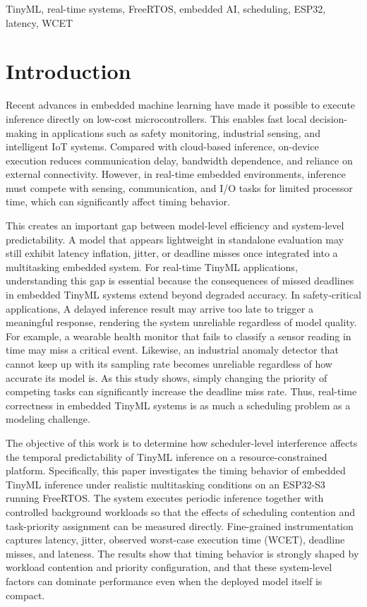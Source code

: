 \documentclass[conference]{IEEEtran}
\begin{document}
\begin{IEEEkeywords}
TinyML, real-time systems, FreeRTOS, embedded AI, scheduling, ESP32, latency, WCET
\end{IEEEkeywords}
\section{Introduction}
Recent advances in embedded machine learning have made it possible to execute inference directly on low-cost microcontrollers. This enables fast local decision-making in applications such as safety monitoring, industrial sensing, and intelligent IoT systems. Compared with cloud-based inference, on-device execution reduces communication delay, bandwidth dependence, and reliance on external connectivity. However, in real-time embedded environments, inference must compete with sensing, communication, and I/O tasks for limited processor time, which can significantly affect timing behavior.

This creates an important gap between model-level efficiency and system-level predictability. A model that appears lightweight in standalone evaluation may still exhibit latency inflation, jitter, or deadline misses once integrated into a multitasking embedded system. For real-time TinyML applications, understanding this gap is essential because the consequences of missed deadlines in embedded TinyML systems extend beyond degraded accuracy. 
In safety-critical applications, %
A delayed inference result may arrive too late to trigger a meaningful response, rendering the system unreliable regardless of model quality. 
For example, a wearable health monitor that fails to classify a sensor reading in time may miss a critical event. 
Likewise, an industrial anomaly detector that cannot keep up with its sampling rate becomes unreliable regardless of how accurate its model is. As this study shows, simply changing the priority of competing tasks can significantly increase the deadline miss rate. Thus, real-time correctness in embedded TinyML systems is as much a scheduling problem as a modeling challenge.

The objective of this work is to determine how scheduler-level interference affects the temporal predictability of TinyML inference on a resource-constrained platform. 
Specifically, this paper investigates the timing behavior of embedded TinyML inference under realistic multitasking conditions on an ESP32-S3 running FreeRTOS. The system executes periodic inference together with controlled background workloads so that the effects of scheduling contention and task-priority assignment can be measured directly. Fine-grained instrumentation captures latency, jitter, observed worst-case execution time (WCET), deadline misses, and lateness. 
The results show that timing behavior is strongly shaped by workload contention and priority configuration, and that these system-level factors can dominate performance even when the deployed model itself is compact.
\end{document}
